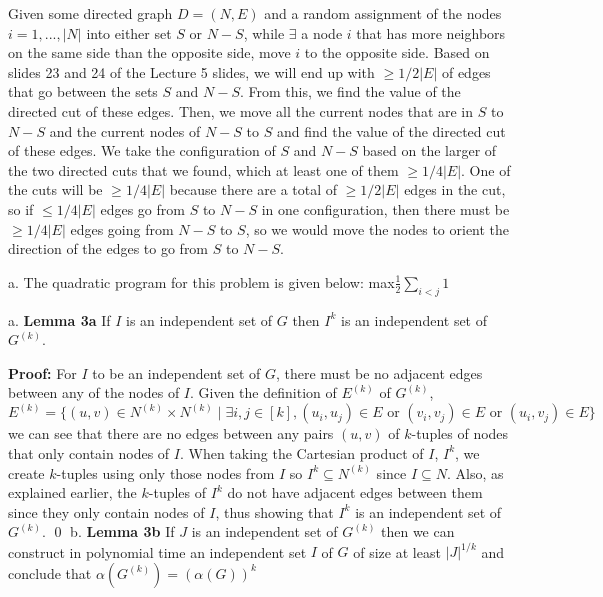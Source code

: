 \documentclass[oneside]{homework} %
\begin{document}
Given some directed graph $D = (N,E)$ and a random assignment of the nodes $i = 1,...,|N|$ into either set $S$ or $N-S$, while $\exists$ a node $i$ that has more neighbors on the same side than the opposite side, move $i$ to the opposite side. Based on slides 23 and 24 of the Lecture 5 slides, we will end up with $\geq 1/2|E|$ of edges that go between the sets $S$ and $N-S$. From this, we find the value of the directed cut of these edges. Then, we move all the current nodes that are in $S$ to $N-S$ and the current nodes of $N-S$ to $S$ and find the value of the directed cut of these edges. We take the configuration of $S$ and $N-S$ based on the larger of the two directed cuts that we found, which at least one of them $\geq 1/4|E|$. One of the cuts will be $\geq 1/4|E|$ because there are a total of $\geq 1/2|E|$ edges in the cut, so if $\leq 1/4|E|$ edges go from $S$ to $N-S$ in one configuration, then there must be $\geq 1/4|E|$ edges going from $N-S$ to $S$, so we would move the nodes to orient the direction of the edges to go from $S$ to $N-S$.

{\large a.} The quadratic program for this problem is given below:
\newline
\newline
max$\frac{1}{2}\sum_{i<j}^{}1$


{\large a.} \textbf{Lemma 3a} If $I$ is an independent set of $G$ then $I^k$ is an independent set of $G^{(k)}$.
\newline

\textbf{Proof:} For $I$ to be an independent set of $G$, there must be no adjacent edges between any of the nodes of $I$. Given the definition of $E^{(k)}$ of $G^{(k)}$, $$E^{(k)} = \{(u, v) \in N^{(k)} \times N^{(k)} \mid \exists i, j \in [k], (u_i, u_j) \in E \text{ or } (v_i, v_j) \in E \text{ or } (u_i, v_j) \in E\}$$ we can see that there are no edges between any pairs $(u, v)$ of $k$-tuples of nodes that only contain nodes of $I$. When taking the Cartesian product of $I$, $I^k$, we create $k$-tuples using only those nodes from $I$ so $I^k \subseteq N^{(k)}$ since $I \subseteq N$. Also, as explained earlier, the $k$-tuples of $I^k$ do not have adjacent edges between them since they only contain nodes of $I$, thus showing that $I^k$ is an independent set of $G^{(k)}$. \hfill\qed
\newline
\newline
{\large b.} \textbf{Lemma 3b} If $J$ is an independent set of $G^{(k)}$ then we can construct in polynomial time an independent set $I$ of $G$ of size at least $|J|^{1/k}$ and conclude that $\alpha(G^{(k)}) = (\alpha(G))^k$
\newline
\end{document}
